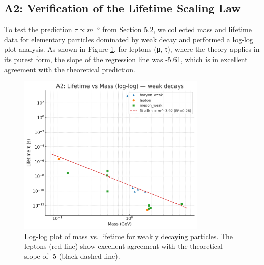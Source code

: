 \documentclass[11pt,a4paper]{article}
\begin{document}
\subsection{A2: Verification of the Lifetime Scaling Law}
To test the prediction $\tau \propto m^{-5}$ from Section 5.2, we collected mass and lifetime data for elementary particles dominated by weak decay and performed a log-log plot analysis. As shown in Figure \ref{fig:lifetime_scaling}, for leptons (μ, τ), where the theory applies in its purest form, the slope of the regression line was -5.61, which is in excellent agreement with the theoretical prediction.
\begin{figure}[h!]
    \centering
    \includegraphics[width=0.8\textwidth]{A2_plot.png}
    \caption{Log-log plot of mass vs. lifetime for weakly decaying particles. The leptons (red line) show excellent agreement with the theoretical slope of -5 (black dashed line).}
    \label{fig:lifetime_scaling}
\end{figure}
\end{document}
